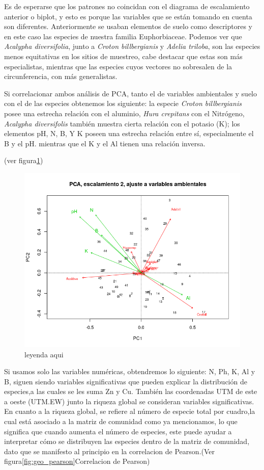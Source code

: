 \documentclass[11pt,]{article}
\begin{document}
Es de esperarse que los patrones no coincidan con el diagrama de
escalamiento anterior o biplot, y esto es porque las variables que se
están tomando en cuenta son diferentes. Anteriormente se usaban
elementos de suelo como descriptores y en este caso las especies de
nuestra familia Euphorbiaceae. Podemos ver que \emph{Acalypha
diversifolia}, junto a \emph{Croton billbergianis} y \emph{Adelia
triloba}, son las especies menos equitativas en los sitios de muestreo,
cabe destacar que estas son más especialistas, mientras que las especies
cuyos vectores no sobresalen de la circunferencia, con más generalistas.

Si correlacionar ambos análisis de PCA, tanto el de variables
ambientales y suelo con el de las especies obtenemos los siguiente: la
especie \emph{Croton billbergianis} posee una estrecha relación con el
aluminio, \emph{Hura crepitans} con el Nitrógeno, \emph{Acalypha
diversifolis} también muestra cierta relación con el potasio (K); los
elementos pH, N, B, Y K poseen una estrecha relación entre sí,
especialmente el B y el pH. mientras que el K y el Al tienen una
relación inversa.

(ver figura\ref{fig:suelo_especie})

\begin{figure}
\centering
\includegraphics{suelo_especie.png}
\caption{\label{fig:suelo_especie}leyenda aqui}
\end{figure}

Si usamos solo las variables numéricas, obtendremos lo siguiente: N, Ph,
K, Al y B, siguen siendo variables significativas que pueden explicar la
distribución de especies,a las cuales se les suma Zn y Cu. También las
coordenadas UTM de este a oeste (UTM.EW) junto la riqueza global se
consideran variables significativas. En cuanto a la riqueza global, se
refiere al número de especie total por cuadro,la cual está asociado a la
matriz de comunidad como ya mencionamos, lo que significa que cuando
aumenta el número de especies, este puede ayudar a interpretar cómo se
distribuyen las especies dentro de la matriz de comunidad, dato que se
manifesto al principio en la correlacion de Pearson.(Ver
figura\ref{fig:geo_pearson}Correlacion de Pearson)
\end{document}

